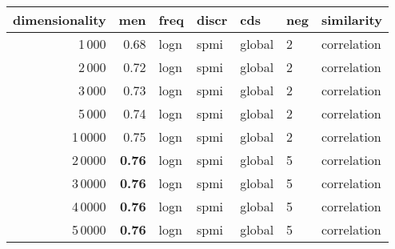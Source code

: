 \begin{tabular}{rrlllll}
\toprule
 dimensionality &   men &  freq & discr &     cds & neg &   similarity \\
\midrule
           1\,000 &  0.68 &  logn &  spmi &  global &   2 &  correlation \\
           2\,000 &  0.72 &  logn &  spmi &  global &   2 &  correlation \\
           3\,000 &  0.73 &  logn &  spmi &  global &   2 &  correlation \\
           5\,000 &  0.74 &  logn &  spmi &  global &   2 &  correlation \\
          1\,0000 &  0.75 &  logn &  spmi &  global &   2 &  correlation \\
          2\,0000 &  \textbf{0.76} &  logn &  spmi &  global &   5 &  correlation \\
          3\,0000 &  \textbf{0.76} &  logn &  spmi &  global &   5 &  correlation \\
          4\,0000 &  \textbf{0.76} &  logn &  spmi &  global &   5 &  correlation \\
          5\,0000 &  \textbf{0.76} &  logn &  spmi &  global &   5 &  correlation \\
\bottomrule
\end{tabular}

